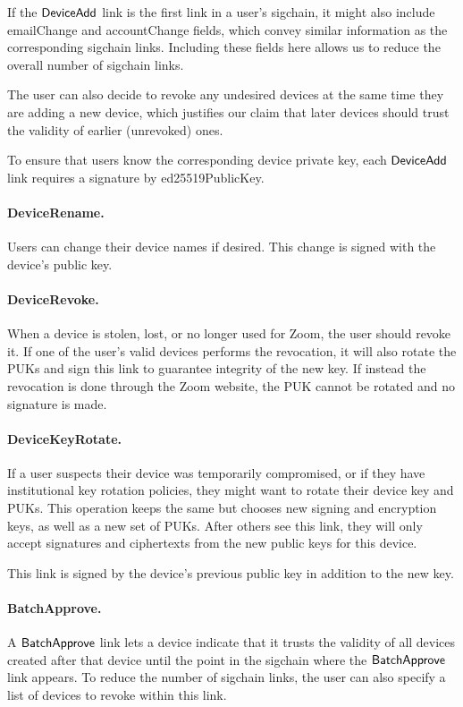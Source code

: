 If the $\mathsf{DeviceAdd}{}$ link is the first link in a user's sigchain, it might also include
\textsf{emailChange} and \textsf{accountChange} fields, which convey similar information as the
corresponding sigchain links. Including these fields here allows us to reduce the overall number of
sigchain links.

The user can also decide to revoke any undesired devices at the same time they are adding a new device,
which justifies our claim that later devices should trust the validity of earlier (unrevoked) ones.

To ensure that users know the corresponding device private key, each $\mathsf{DeviceAdd}{}$ link requires a
signature by \textsf{ed25519PublicKey}.

\paragraph{DeviceRename.} Users can change their device names if desired. This change is signed with
the device's public key.

\paragraph{DeviceRevoke.} When a device is stolen, lost, or no longer used for Zoom, the user should
revoke it. If one of the user’s valid devices performs the revocation, it will also rotate the PUKs
and sign this link to guarantee integrity of the new key. If instead the revocation is done through
the Zoom website, the PUK cannot be rotated and no signature is made.

\paragraph{DeviceKeyRotate.} If a user suspects their device was temporarily compromised, or if
they have institutional key rotation policies, they might want to rotate their device key and PUKs.
This operation keeps the same \deviceid but chooses new signing and encryption keys, as well as a
new set of PUKs. After others see this link, they will only accept signatures and ciphertexts from
the new public keys for this device.

This link is signed by the device's previous public key in addition to the new key.

\paragraph{BatchApprove.} A $\mathsf{BatchApprove}{}$ link lets a device indicate that it trusts the
validity of all devices created after that device until the point in the sigchain where the
$\mathsf{BatchApprove}{}$ link appears. To reduce the number of sigchain links,
the user can also specify a list of devices to revoke within this link.

